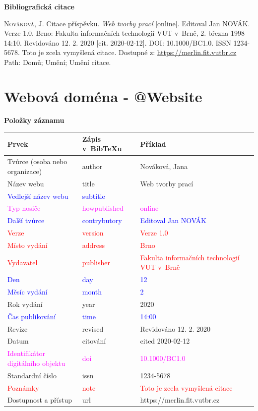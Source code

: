 \bigskip

\noindent \textbf{Bibliografická citace}

\medskip

\noindent \textsc{Nováková}, J. Citace příspěvku. \textit{Web tvorby prací} [online]. Editoval Jan NOVÁK. Verze 1.0. Brno: Fakulta informačních technologií VUT v~Brně, 2. března 1998 14:10. Revidováno 12. 2. 2020 [cit. 2020-02-12]. DOI: 10.1000/BC1.0. ISSN 1234-5678. Toto je zcela vymyšlená citace. Dostupné z: \url{https://merlin.fit.vutbr.cz} Path: Domů; Umění; Umění citace.
\newpage
\section*{Webová doména - @Website}
\label{pr-website}
\noindent \textbf{Položky záznamu}

\medskip

\begin{tabularx}{\linewidth}{X X X}
    Prvek & Zápis v~BibTeXu & Příklad\\\hline
    Tvůrce (osoba nebo organizace) & author & Nováková, Jana\\
    Název webu & title & Web tvorby prací\\
    \textcolor{blue}{Vedlejší název webu} &  \textcolor{blue}{subtitle} & \\
    \textcolor{magenta}{Typ nosiče} & \textcolor{magenta}{howpublished} & \textcolor{magenta}{online}\\
    \textcolor{blue}{Další tvůrce} & \textcolor{blue}{contrybutory} & \textcolor{blue}{Editoval Jan NOVÁK}\\
    \textcolor{red}{Verze} & \textcolor{red}{version} & \textcolor{red}{Verze 1.0}\\
    \textcolor{red}{Místo vydání} & \textcolor{red}{address} & \textcolor{red}{Brno}\\
    \textcolor{red}{Vydavatel} & \textcolor{red}{publisher} & \textcolor{red}{Fakulta informačních technologií VUT v~Brně}\\
    \textcolor{blue}{Den} & \textcolor{blue}{day} & \textcolor{blue}{12}\\
    \textcolor{blue}{Měsíc vydání} & \textcolor{blue}{month} & \textcolor{blue}{2}\\
    Rok vydání & year & 2020\\
    \textcolor{blue}{Čas publikování} & \textcolor{blue}{time} & \textcolor{blue}{14:00}\\
    Revize & revised & Revidováno 12. 2. 2020\\
    Datum & citování & cited 2020-02-12\\
    \textcolor{magenta}{Identifikátor digitálního objektu} & \textcolor{magenta}{doi} & \textcolor{magenta}{10.1000/BC1.0}\\
    Standardní číslo & issn & 1234-5678\\
    \textcolor{red}{Poznámky} & \textcolor{red}{note} & \textcolor{red}{Toto je zcela vymyšlená citace}\\
    Dostupnost a přístup & url & https://merlin.fit.vutbr.cz
\end{tabularx}

